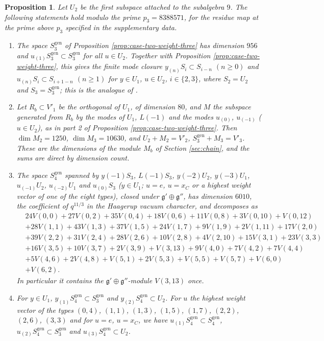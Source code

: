 \documentclass[leqno]{article}
\renewcommand{\geq}{\ensuremath{\geqslant}}
\newtheorem{prop}[thm]{Proposition}
\numberwithin{equation}{section}
\begin{document}
\begin{prop}
\label{prop:weight-three-four}
Let $U_2$ be the first subspace attached to the subalgebra $9$. The following statements hold modulo the prime $p_3 = 8388571$, for the residue map at the prime above $p_3$ specified in the supplementary data.
\begin{enumerate}
\item The space $S_3^{\mathrm{gen}}$ of Proposition \ref{prop:case-two-weight-three} has dimension $956$ and $u_{(1)}S_3^{\mathrm{gen}} \subset S_3^{\mathrm{gen}}$ for all $u \in U_2$. Together with Proposition \ref{prop:case-two-weight-three}, this gives the finite mode closure $y_{(n)}S_i \subset S_{i-n}$ $(n \geq 0)$ and $u_{(n)}S_i \subset S_{i+1-n}$ $(n \geq 1)$ for $y \in U_1$, $u \in U_2$, $i \in \{2,3\}$, where $S_2 = U_2$ and $S_3 = S_3^{\mathrm{gen}}$; this is the analogue of \cite[Proposition 4.1]{Rie26b}.
\item Let $R_b \subset V'_1$ be the orthogonal of $U_1$, of dimension $80$, and $M$ the subspace generated from $R_b$ by the modes of $U_1$, $L(-1)$ and the modes $u_{(0)}$, $u_{(-1)}$ ($u \in U_2$), as in part 2 of Proposition \ref{prop:case-two-weight-three}. Then $\dim M_2 = 1250$, $\dim M_3 = 10630$, and $U_2 + M_2 = V'_2$, $S_3^{\mathrm{gen}} + M_3 = V'_3$. These are the dimensions of the module $M_b$ of Section \ref{sec:chain}, and the sums are direct by dimension count.
\item The space $S_4^{\mathrm{gen}}$ spanned by $y(-1)S_3$, $L(-1)S_3$, $y(-2)U_2$, $y(-3)U_1$, $u_{(-1)}U_2$, $u_{(-2)}U_1$ and $u_{(0)}S_3$ ($y \in U_1$; $u = e$, $u = x_C$ or a highest weight vector of one of the eight types), closed under $\mathfrak g' \oplus \mathfrak g''$, has dimension $6010$, the coefficient of $q^{11/3}$ in the Haagerup vacuum character, and decomposes as
\[
\begin{aligned}
&24V(0,0)+27V(0,2)+35V(0,4)+18V(0,6)+11V(0,8)+3V(0,10)+V(0,12)\\
&+28V(1,1)+43V(1,3)+37V(1,5)+24V(1,7)+9V(1,9)+2V(1,11)+17V(2,0)\\
&+39V(2,2)+31V(2,4)+28V(2,6)+10V(2,8)+4V(2,10)+15V(3,1)+23V(3,3)\\
&+16V(3,5)+10V(3,7)+2V(3,9)+V(3,13)+9V(4,0)+7V(4,2)+7V(4,4)\\
&+5V(4,6)+2V(4,8)+V(5,1)+2V(5,3)+V(5,5)+V(5,7)+V(6,0)\\
&+V(6,2).
\end{aligned}
\]
In particular it contains the $\mathfrak g' \oplus \mathfrak g''$-module $V(3,13)$ once.
\item For $y \in U_1$, $y_{(1)}S_4^{\mathrm{gen}} \subset S_3^{\mathrm{gen}}$ and $y_{(2)}S_4^{\mathrm{gen}} \subset U_2$. For $u$ the highest weight vector of the types $(0,4)$, $(1,1)$, $(1,3)$, $(1,5)$, $(1,7)$, $(2,2)$, $(2,6)$, $(3,3)$ and for $u = e$, $u = x_C$, we have $u_{(1)}S_4^{\mathrm{gen}} \subset S_4^{\mathrm{gen}}$, $u_{(2)}S_4^{\mathrm{gen}} \subset S_3^{\mathrm{gen}}$ and $u_{(3)}S_4^{\mathrm{gen}} \subset U_2$.

\end{enumerate}
\end{prop}
\end{document}
